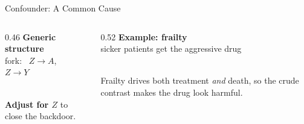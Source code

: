 \documentclass[aspectratio=169]{beamer}
\begin{document}
\begin{frame}{Confounder: A Common Cause}
  \small
  \begin{columns}[T]
    \begin{column}{0.46\textwidth}
      \centering
      \textbf{Generic structure}\\ {\scriptsize fork: \ $Z \to A$, \ \ $Z \to Y$}\\[0.9em]
      \\[0.9em]
      \textcolor{good}{\textbf{Adjust for $Z$}} to close the backdoor.
    \end{column}
    \begin{column}{0.52\textwidth}
      \centering
      \textbf{Example: frailty}\\ {\scriptsize sicker patients get the aggressive drug}\\[0.9em]
      \\[0.9em]
      {\scriptsize Frailty drives both treatment \emph{and} death, so the crude contrast makes the drug look harmful.}
    \end{column}
  \end{columns}
\end{frame}
\end{document}
